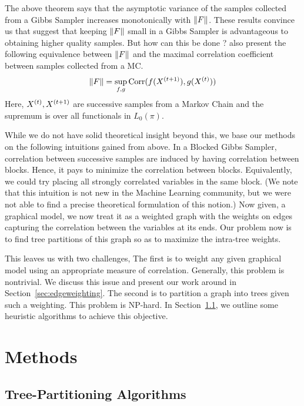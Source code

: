 \documentclass{article} %
\begin{document}
The above theorem says that the asymptotic variance of the samples collected
from a Gibbs Sampler increases monotonically with $\left\|F\right\|$. These results
convince us that suggest that keeping $\left\|F\right\|$ small in a Gibbs Sampler is
advantageous to obtaining higher quality samples. But how can this be done ?
\cite{liu01mcmcscicomp} also present the following equivalence between $\left\|F\right\|$
and the maximal correlation coefficient between samples collected from a MC.
\begin{equation}
\|F\| = \sup_{f,g} \text{Corr}(f(X^{(t+1)}), g(X^{(t)}))
\end{equation}
Here, $X^{(t)}, X^{(t+1)}$ are successive samples from a Markov Chain and the
supremum is over all functionals in $L_0(\pi)$.

While we do not have solid theoretical insight beyond this, we base our methods
on the following intuitions gained from above. In a Blocked Gibbs Sampler,
correlation between successive samples are induced by having correlation between
blocks. Hence, it pays to minimize the correlation between blocks. Equivalently,
we could try placing all strongly correlated variables in the same block. (We
note that this intuition is not new in the Machine Learning community, but we
were not able to find a precise theoretical formulation of this notion.) Now
given,
a graphical model, we now treat it as a weighted graph with the weights on edges
capturing the correlation between the variables at its ends. Our problem now is
to find tree partitions of this graph so as to maximize the intra-tree weights.

This leaves us with two challenges, The first 
is to weight any given graphical model using an
appropriate measure of correlation. Generally, this problem is nontrivial. We
discuss this issue and present our work around in
Section~\ref{sec:edgeweighting}. 
The second is to partition a graph into trees given such a weighting. 
This problem is NP-hard. In Section~\ref{sec:tpalgos}, we outline some heuristic
algorithms to achieve this objective.


\section{Methods}

\subsection{Tree-Partitioning Algorithms}
\label{sec:tpalgos}
\end{document}

